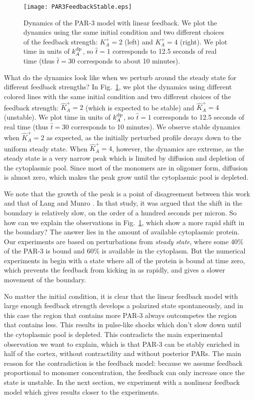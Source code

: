\documentclass[11pt]{article}
\newcommand{\6}[1]{#1_{\text{6}}}
\newcommand{\3}[1]{#1_{\text{3}}}
\begin{document}
\begin{figure}
\centering
\texttt{[image: PAR3FeedbackStable.eps]}
\caption{\label{fig:PAR3Dyn}Dynamics of the PAR-3 model with linear feedback. We plot the dynamics using the same initial condition and two different choices of the feedback strength: $K_A^+=2$ (left) and $K_A^+=4$ (right). We plot time in units of $k^\text{dp}_A$, so $\hat t =1$ corresponds to 12.5 seconds of real time (thus $\hat t = 30$ corresponds to about 10 minutes).}
\end{figure}

What do the dynamics look like when we perturb around the steady state for different feedback strengths? In Fig.\ \ref{fig:PAR3Dyn}, we plot the dynamics using different colored lines with the same initial condition and two different choices of the feedback strength: $\hat K_A^+=2$ (which is expected to be stable) and $\hat K_A^+=4$ (unstable). We plot time in units of $k^\text{dp}_A$, so $\hat t =1$ corresponds to 12.5 seconds of real time (thus $\hat t = 30$ corresponds to 10 minutes). We observe stable dynamics when $\hat K_A^+=2$ as expected, as the initially perturbed profile decays down to the uniform steady state. When $\hat K_A^+=4$, however, the dynamics are extreme, as the steady state is a very narrow peak which is limited by diffusion and depletion of the cytoplasmic pool. Since most of the monomers are in oligomer form, diffusion is almost zero, which makes the peak grow until the cytoplasmic pool is depleted.

We note that the growth of the peak is a point of disagreement between this work and that of Lang and Munro \cite{lang2022oligomerization}. In that study, it was argued that the shift in the boundary is relatively slow, on the order of a hundred seconds per micron. So how can we explain the observations in Fig.\ \ref{fig:PAR3Dyn}, which show a more rapid shift in the boundary? The answer lies in the amount of available cytoplasmic protein. Our experiments are based on perturbations from \emph{steady state}, where some 40\% of the PAR-3 is bound and 60\% is available in the cytoplasm. But the numerical experiments in \cite[Fig.~4D]{lang2022oligomerization} begin with a state where all of the protein is bound at time zero, which prevents the feedback from kicking in as rapidly, and gives a slower movement of the boundary.

No matter the initial condition, it is clear that the linear feedback model with large enough feedback strength develops a polarized state spontaneously, and in this case the region that contains more PAR-3 always outcompetes the region that contains less. This results in pulse-like shocks which don't slow down until the cytoplasmic pool is depleted. This contradicts the main experimental observation we want to explain, which is that PAR-3 can be stably enriched in half of the cortex, without contractility and without posterior PARs. The main reason for the contradiction is the feedback model: because we assume feedback proportional to monomer concentration, the feedback can only increase once the state is unstable. In the next section, we experiment with a nonlinear feedback model which gives results closer to the experiments.
\end{document}
